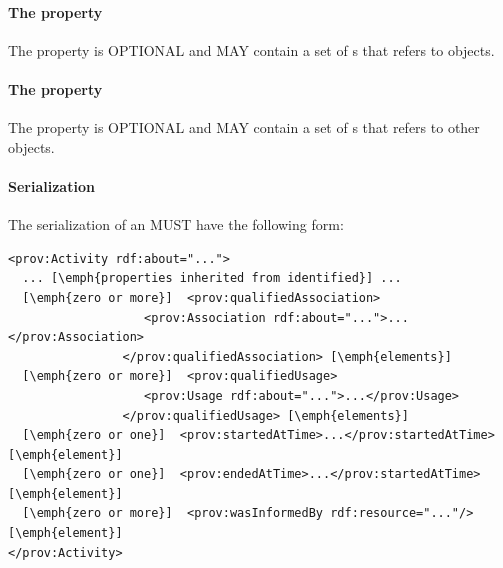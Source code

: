 {\paragraph{The  property}\label{sec:usages}
The  property is OPTIONAL and MAY contain a set of s that refers to  objects.

\paragraph{The  property}\label{sec:wasInformedBys}
The  property is OPTIONAL and MAY contain a set of s that refers to other  objects.

\paragraph{Serialization}
The serialization of an  MUST have the following form:
}

\begin{lstlisting}
<prov:Activity rdf:about="...">
  ... [\emph{properties inherited from identified}] ...
  [\emph{zero or more}]  <prov:qualifiedAssociation>
                   <prov:Association rdf:about="...">...</prov:Association>
                </prov:qualifiedAssociation> [\emph{elements}]
  [\emph{zero or more}]  <prov:qualifiedUsage>
                   <prov:Usage rdf:about="...">...</prov:Usage>
                </prov:qualifiedUsage> [\emph{elements}]             
  [\emph{zero or one}]  <prov:startedAtTime>...</prov:startedAtTime> [\emph{element}]
  [\emph{zero or one}]  <prov:endedAtTime>...</prov:startedAtTime> [\emph{element}] 
  [\emph{zero or more}]  <prov:wasInformedBy rdf:resource="..."/> [\emph{element}] 
</prov:Activity>
\end{lstlisting}


